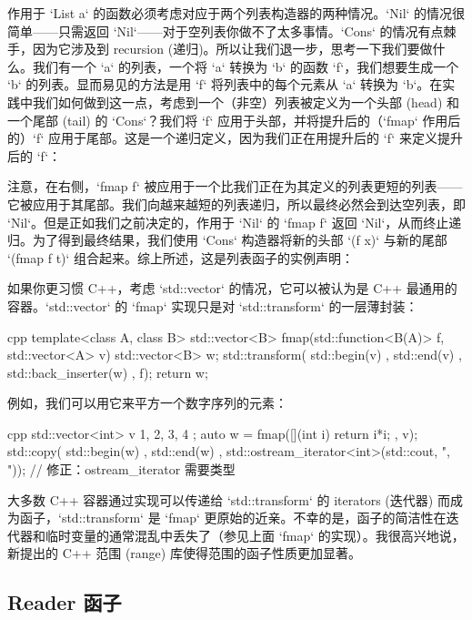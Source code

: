 作用于 `List a` 的函数必须考虑对应于两个列表构造器的两种情况。`Nil` 的情况很简单——只需返回 `Nil`——对于空列表你做不了太多事情。`Cons` 的情况有点棘手，因为它涉及到 recursion (递归)。所以让我们退一步，思考一下我们要做什么。我们有一个 `a` 的列表，一个将 `a` 转换为 `b` 的函数 `f`，我们想要生成一个 `b` 的列表。显而易见的方法是用 `f` 将列表中的每个元素从 `a` 转换为 `b`。在实践中我们如何做到这一点，考虑到一个（非空）列表被定义为一个头部 (head) 和一个尾部 (tail) 的 `Cons`？我们将 `f` 应用于头部，并将提升后的（`fmap` 作用后的）`f` 应用于尾部。这是一个递归定义，因为我们正在用提升后的 `f` 来定义提升后的 `f`：

注意，在右侧，`fmap f` 被应用于一个比我们正在为其定义的列表更短的列表——它被应用于其尾部。我们向越来越短的列表递归，所以最终必然会到达空列表，即 `Nil`。但是正如我们之前决定的，作用于 `Nil` 的 `fmap f` 返回 `Nil`，从而终止递归。为了得到最终结果，我们使用 `Cons` 构造器将新的头部 `(f x)` 与新的尾部 `(fmap f t)` 组合起来。综上所述，这是列表函子的实例声明：

如果你更习惯 C++，考虑 `std::vector` 的情况，它可以被认为是 C++ 最通用的容器。`std::vector` 的 `fmap` 实现只是对 `std::transform` 的一层薄封装：

\begin{snip}{cpp}
template<class A, class B>
std::vector<B> fmap(std::function<B(A)> f, std::vector<A> v) {
    std::vector<B> w;
    std::transform( std::begin(v)
                  , std::end(v)
                  , std::back_inserter(w)
                  , f);
    return w;
}
\end{snip}
例如，我们可以用它来平方一个数字序列的元素：

\begin{snip}{cpp}
std::vector<int> v{ 1, 2, 3, 4 };
auto w = fmap([](int i) { return i*i; }, v);
std::copy( std::begin(w)
         , std::end(w)
         , std::ostream_iterator<int>(std::cout, ", ")); // 修正：ostream_iterator 需要类型
\end{snip}
大多数 C++ 容器通过实现可以传递给 `std::transform` 的 iterators (迭代器) 而成为函子，`std::transform` 是 `fmap` 更原始的近亲。不幸的是，函子的简洁性在迭代器和临时变量的通常混乱中丢失了（参见上面 `fmap` 的实现）。我很高兴地说，新提出的 C++ 范围 (range) 库使得范围的函子性质更加显著。

\subsection{Reader 函子}

